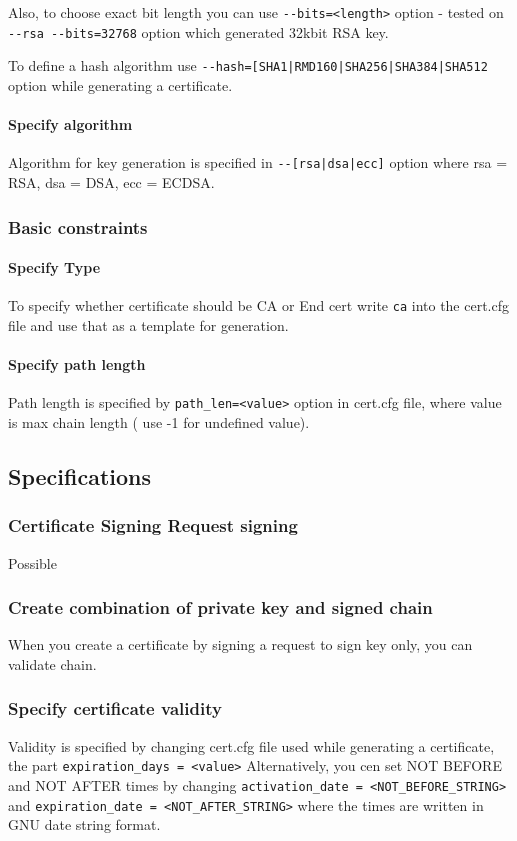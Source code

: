 \documentclass[10pt, a4paper]{report}
\begin{document}
Also, to choose exact bit length you can use \verb+--bits=<length>+ option - tested on \verb+--rsa --bits=32768+ option which generated 32kbit RSA key.

To define a hash algorithm use \verb+--hash=[SHA1|RMD160|SHA256|SHA384|SHA512+ option while generating a certificate.

      \paragraph{Specify algorithm}
Algorithm for key generation is specified in \verb+--[rsa|dsa|ecc]+ option where rsa = RSA, dsa = DSA, ecc = ECDSA.
    
  \subsubsection{Basic constraints}
    
      \paragraph{Specify Type}
To specify whether certificate should be CA or End cert write \verb+ca+ into the cert.cfg file and use that as a template for generation. 
      \paragraph{Specify path length}
Path length is specified by \verb+path_len=<value>+ option in cert.cfg file, where value is max chain length ( use -1 for undefined value).

  \subsection{Specifications}
  
    \subsubsection{Certificate Signing Request signing}
Possible %
    \subsubsection{Create combination of private key and signed chain}
When you create a certificate by signing a request to sign key only, you can validate chain. %
    \subsubsection{Specify certificate validity}
Validity is specified by changing cert.cfg file used while generating a certificate, the part \verb+expiration_days = <value>+
Alternatively, you cen set NOT BEFORE and NOT AFTER times by changing \verb+activation_date = <NOT_BEFORE_STRING>+ and \verb+expiration_date = <NOT_AFTER_STRING>+ where the times are written in GNU date string format.
\end{document}
